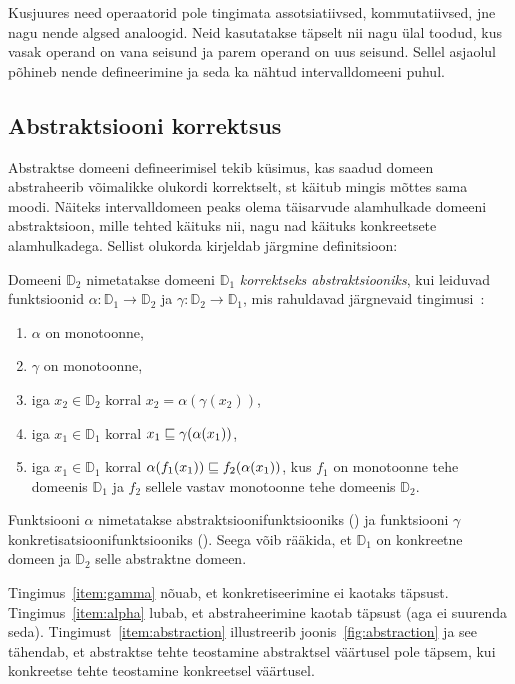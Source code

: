 \documentclass[../thesis.tex]{subfiles}
\begin{document}
Kusjuures need operaatorid pole tingimata assotsiatiivsed, kommutatiivsed, jne nagu nende algsed analoogid. Neid kasutatakse täpselt nii nagu ülal toodud, kus vasak operand on vana seisund ja parem operand on uus seisund. Sellel asjaolul põhineb nende defineerimine ja seda ka nähtud intervalldomeeni puhul.

\subsection{Abstraktsiooni korrektsus}
\label{sec:abstraction-props}
Abstraktse domeeni defineerimisel tekib küsimus, kas saadud domeen abstraheerib võimalikke olukordi korrektselt, st käitub mingis mõttes sama moodi. Näiteks intervalldomeen peaks olema täisarvude alamhulkade domeeni abstraktsioon, mille tehted käituks nii, nagu nad käituks konkreetsete alamhulkadega. Sellist olukorda kirjeldab järgmine definitsioon:
\begin{definition}
\label{def:abstraction}
Domeeni $\mathbb{D}_2$ nimetatakse domeeni $\mathbb{D}_1$ \emph{korrektseks abstraktsiooniks}, kui leiduvad funktsioonid $\alpha: \mathbb{D}_1 \to \mathbb{D}_2$ ja $\gamma: \mathbb{D}_2 \to \mathbb{D}_1$, mis rahuldavad järgnevaid tingimusi~\cite[242]{cousot77}:
\begin{enumerate}[nosep]
	\item $\alpha$ on monotoonne, \label{item:alphamono}
	\item $\gamma$ on monotoonne,
	\item iga $x_2 \in \mathbb{D}_2$ korral $x_2 = \alpha (\gamma (x_2))$, \label{item:gamma}
	\item iga $x_1 \in \mathbb{D}_1$ korral $x_1 \sqsubseteq \gamma (\alpha (x_1))$, \label{item:alpha}
	\item iga $x_1 \in \mathbb{D}_1$ korral $\alpha (f_1 (x_1)) \sqsubseteq f_2 (\alpha (x_1))$, kus $f_1$ on monotoonne tehe domeenis $\mathbb{D}_1$ ja $f_2$ sellele vastav monotoonne tehe domeenis $\mathbb{D}_2$. \label{item:abstraction}
\end{enumerate}
\end{definition}
Funktsiooni $\alpha$ nimetatakse abstraktsioonifunktsiooniks () ja funktsiooni $\gamma$ konkretisatsioonifunktsiooniks ().
Seega võib rääkida, et $\mathbb{D}_1$ on konkreetne domeen ja $\mathbb{D}_2$ selle abstraktne domeen.

Tingimus~\ref{item:gamma} nõuab, et konkretiseerimine ei kaotaks täpsust.
Tingimus~\ref{item:alpha} lubab, et abstraheerimine kaotab täpsust (aga ei suurenda seda).
Tingimust~\ref{item:abstraction} illustreerib joonis~\ref{fig:abstraction} ja see tähendab, et abstraktse tehte teostamine abstraktsel väärtusel pole täpsem, kui konkreetse tehte teostamine konkreetsel väärtusel.
\end{document}
